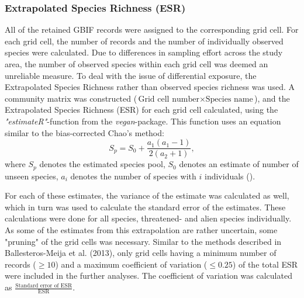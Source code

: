 \documentclass{article}
\begin{document}
\subsubsection{Extrapolated Species Richness (ESR)} \label{sec:data_criteria}
All of the retained GBIF records were assigned to the corresponding grid cell. For each grid cell, the number of records and the number of individually observed species were calculated. Due to differences in sampling effort across the study area, the number of observed species within each grid cell was deemed an unreliable measure. To deal with the issue of differential exposure, the Extrapolated Species Richness rather than observed species richness was used.
 A community matrix was constructed ($\text{Grid cell number} \times \text{Species name}$), and the Extrapolated Species Richness (ESR) for each grid cell calculated, using the \textit{"estimateR"}-function from the \textit{vegan}-package. This function uses an equation similar to the bias-corrected Chao's method:
    \begin{equation*}
        S_p = S_0 + \frac{a_1 (a_1-1)}{2(a_2 + 1)} ,
    \end{equation*}
where $S_p$ denotes the estimated species pool, $S_0$ denotes an estimate of number of unseen species, $a_i$ denotes the number of species with $i$ individuals (\cite{Oksanen2017}). %
    
For each of these estimates, the variance of the estimate was calculated as well, which in turn was used to calculate the standard error of the estimates.
These calculations were done for all species, threatened- and alien species individually.\\

As some of the estimates from this extrapolation are rather uncertain, some "pruning" of the grid cells was necessary. Similar to the methods described in Ballesteros-Meija et al. (2013), only grid cells having a minimum number of records ($\geq10$) and a maximum coefficient of variation ($\leq0.25$) of the total ESR were included in the further analyses. The coefficient of variation was calculated as $ \frac{\text{Standard error of ESR}}{\text{ESR}}$.
\end{document}

